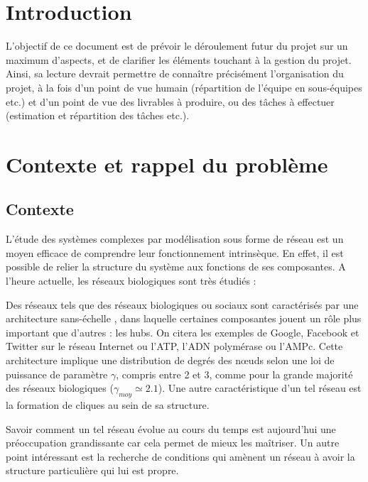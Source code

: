 


\maketitle

\section{Introduction}
L'objectif de ce document est de prévoir le déroulement futur du projet sur un maximum d'aspects, et de clarifier les éléments touchant à la gestion du projet. Ainsi, sa lecture devrait permettre de connaître précisément l'organisation du projet, à la fois d'un point de vue humain (répartition de l'équipe en sous-équipes etc.) et d'un point de vue des livrables à produire, ou des tâches à effectuer (estimation et répartition des tâches etc.).

\section{Contexte et rappel du problème}
\subsection{Contexte}
L'étude des systèmes complexes par modélisation sous forme de réseau est un moyen efficace de comprendre leur fonctionnement intrinsèque. En effet, il est possible de relier la structure du système aux fonctions de ses composantes. A l'heure actuelle, les réseaux biologiques sont très étudiés : 


Des réseaux tels que des réseaux biologiques ou sociaux sont caractérisés par une architecture \og sans-échelle \fg {}, dans laquelle certaines composantes jouent un rôle plus important que d'autres : les hubs. On citera les exemples de Google, Facebook et Twitter sur le réseau Internet ou l'ATP, l'ADN polymérase ou l'AMPc. Cette architecture implique une distribution de degrés des n\oe uds selon une loi de puissance de paramètre $\gamma$, compris entre 2 et 3, comme pour la grande majorité des réseaux biologiques ($\gamma_{moy}\simeq 2.1$). Une autre caractéristique d'un tel réseau est la formation de cliques au sein de sa structure.

\medskip
Savoir comment un tel réseau évolue au cours du temps est aujourd'hui une préoccupation grandissante car cela permet de mieux les maîtriser. Un autre point intéressant est la recherche de conditions qui amènent un réseau à avoir la structure particulière qui lui est propre.

